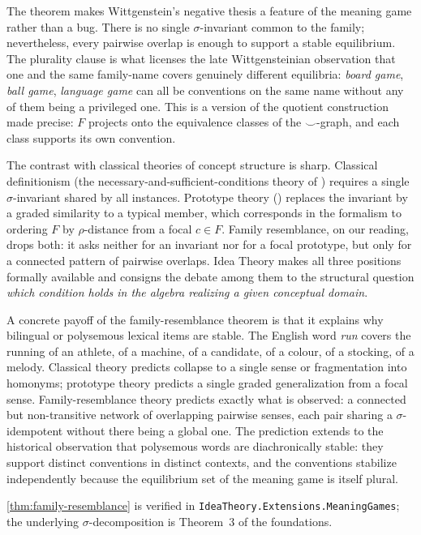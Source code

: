 The theorem makes Wittgenstein's negative thesis a feature of the
meaning game rather than a bug. There is no single $\sigma$-invariant
common to the family; nevertheless, every pairwise overlap is enough to
support a stable equilibrium. The plurality clause is what licenses the
late Wittgensteinian observation that one and the same family-name
covers genuinely different equilibria: \emph{board game}, \emph{ball
game}, \emph{language game} can all be conventions on the same name
without any of them being a privileged one. This is a version of the
quotient construction made precise: $F$ projects onto the equivalence
classes of the $\smile$-graph, and each class supports its own
convention.

The contrast with classical theories of concept structure is sharp.
Classical definitionism (the necessary-and-sufficient-conditions theory
of \cite{FodorPylyshyn1988}) requires a single $\sigma$-invariant
shared by all instances. Prototype theory (\cite{Rosch1973,
RoschMervis1975}) replaces the invariant by a graded similarity to a
typical member, which corresponds in the formalism to ordering $F$ by
$\rho$-distance from a focal $c\in F$. Family resemblance, on our
reading, drops both: it asks neither for an invariant nor for a focal
prototype, but only for a connected pattern of pairwise overlaps. Idea
Theory makes all three positions formally available and consigns the
debate among them to the structural question \emph{which condition
holds in the algebra realizing a given conceptual domain}.

A concrete payoff of the family-resemblance theorem is that it
explains why bilingual or polysemous lexical items are stable. The
English word \emph{run} covers the running of an athlete, of a
machine, of a candidate, of a colour, of a stocking, of a melody.
Classical theory predicts collapse to a single sense or fragmentation
into homonyms; prototype theory predicts a single graded
generalization from a focal sense. Family-resemblance theory predicts
exactly what is observed: a connected but non-transitive network of
overlapping pairwise senses, each pair sharing a $\sigma$-idempotent
without there being a global one. The prediction extends to the
historical observation that polysemous words are diachronically
stable: they support distinct conventions in distinct contexts, and
the conventions stabilize independently because the equilibrium set
of the meaning game is itself plural.

\formalstatus \cref{thm:family-resemblance} is verified in
\texttt{IdeaTheory.Extensions.MeaningGames}; the underlying
$\sigma$-decomposition is Theorem~3 of the foundations.

